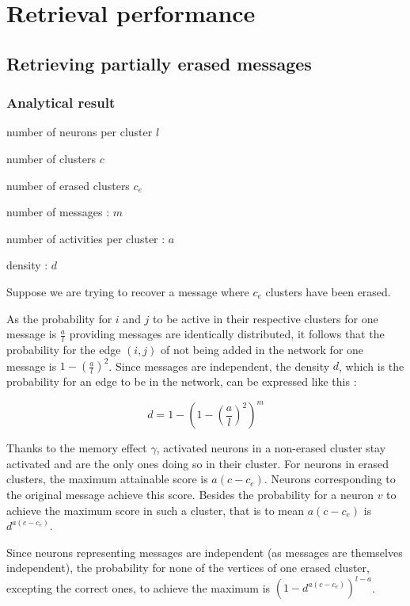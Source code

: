 \documentclass[english,11pt,twocolumn]{article}
\theoremstyle{definition}
\begin{document}
	\section{Retrieval performance}	
	

	\subsection{Retrieving partially erased messages}		
		
	\subsubsection{Analytical result}
		
	number of neurons per cluster $l$
	
	number of clusters $c$
	
	number of erased clusters $c_e$
	
	number of messages : $m$
	
	number of activities per cluster : $a$
	
	density : $d$
	
	Suppose we are trying to recover a message where $c_e$ clusters have been erased.
	
	As the probability for $i$ and $j$ to be active in their respective clusters for one message is $\frac{a}{l}$ providing messages are identically distributed, it follows that the probability for the edge $(i,j)$ of not being added in the network for one message is $1 - \left(\frac{a}{l}\right)^2$. Since messages are independent, the density $d$, which is the probability for an edge to be in the network, can be expressed like this :
	
			
	\[ d = 1 - \left( 1 - \left(\frac{a}{l}\right)^2 \right)^m \]
	
	Thanks to the memory effect $\gamma$, activated neurons in a non-erased cluster stay activated and are the only ones doing so in their cluster. For neurons in erased clusters, the maximum attainable score is $a(c - c_e)$. Neurons corresponding to the original message achieve this score. Besides the probability for a neuron $v$ to achieve the maximum score in such a cluster, that is to mean $a(c-c_e)$ is $d^{a(c-c_e)}$.
	
	
	Since neurons representing messages are independent (as messages are themselves independent), the probability for none of the vertices of one erased cluster, excepting the correct ones, to achieve the maximum is $\left(1 - d^	{a(c-c_e)}\right)^{l-a}$.
	
\end{document}
